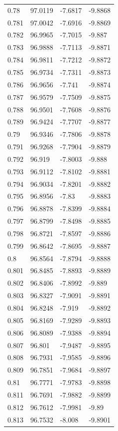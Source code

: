 \begin{tabular}{llll}
0.78 & 97.0119 & -7.6817 & -9.8868 \\
0.781 & 97.0042 & -7.6916 & -9.8869 \\
0.782 & 96.9965 & -7.7015 & -9.887 \\
0.783 & 96.9888 & -7.7113 & -9.8871 \\
0.784 & 96.9811 & -7.7212 & -9.8872 \\
0.785 & 96.9734 & -7.7311 & -9.8873 \\
0.786 & 96.9656 & -7.741 & -9.8874 \\
0.787 & 96.9579 & -7.7509 & -9.8875 \\
0.788 & 96.9501 & -7.7608 & -9.8876 \\
0.789 & 96.9424 & -7.7707 & -9.8877 \\
0.79 & 96.9346 & -7.7806 & -9.8878 \\
0.791 & 96.9268 & -7.7904 & -9.8879 \\
0.792 & 96.919 & -7.8003 & -9.888 \\
0.793 & 96.9112 & -7.8102 & -9.8881 \\
0.794 & 96.9034 & -7.8201 & -9.8882 \\
0.795 & 96.8956 & -7.83 & -9.8883 \\
0.796 & 96.8878 & -7.8399 & -9.8884 \\
0.797 & 96.8799 & -7.8498 & -9.8885 \\
0.798 & 96.8721 & -7.8597 & -9.8886 \\
0.799 & 96.8642 & -7.8695 & -9.8887 \\
0.8 & 96.8564 & -7.8794 & -9.8888 \\
0.801 & 96.8485 & -7.8893 & -9.8889 \\
0.802 & 96.8406 & -7.8992 & -9.889 \\
0.803 & 96.8327 & -7.9091 & -9.8891 \\
0.804 & 96.8248 & -7.919 & -9.8892 \\
0.805 & 96.8169 & -7.9289 & -9.8893 \\
0.806 & 96.8089 & -7.9388 & -9.8894 \\
0.807 & 96.801 & -7.9487 & -9.8895 \\
0.808 & 96.7931 & -7.9585 & -9.8896 \\
0.809 & 96.7851 & -7.9684 & -9.8897 \\
0.81 & 96.7771 & -7.9783 & -9.8898 \\
0.811 & 96.7691 & -7.9882 & -9.8899 \\
0.812 & 96.7612 & -7.9981 & -9.89 \\
0.813 & 96.7532 & -8.008 & -9.8901 \\

\end{tabular}
